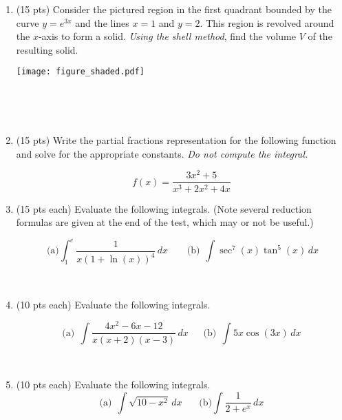 \documentclass[12pt, oneside]{article}   	%
\title{}
\author{MATH1103   \ \ \ \ \ \ Midterm 2 \ \ \ \  October 17, 2021 \ \ \ \ \  Version A \\  \\ Closed book, closed notes; show all your work.}
\date{}							%
\begin{document}
\maketitle
\begin{enumerate}

\item 
(15 pts) Consider the pictured region in the first quadrant bounded by the curve $y=e^{3x}$ and the lines $x=1$ and $y=2$.  This region is revolved around the $x$-axis to form a solid.  \emph{Using the shell method}, find the volume $V$ of the resulting solid.

\texttt{[image: figure\_shaded.pdf]}


\


\

\item (15 pts) Write the partial fractions representation for the following function and solve for the appropriate constants. \emph{Do not compute the integral.}  

$$ f(x)= \dfrac{3x^2+5}{x^3+2x^2+4x} $$


\newpage

\item (15 pts each) Evaluate the following integrals. (Note several reduction formulas are given at the end of the test, which may or not be useful.)

$$ \ \textrm{(a)} \int_1^e \dfrac{ 1}{x(1+\ln(x))^4} \, dx \ \ \ \ \ \ \ \ \ \textrm{(b)}  \ \  \int \sec^7(x) \tan^5(x) \, dx$$

\

\item (10 pts each) Evaluate the following integrals.

$$\textrm{(a)} \ \  \int   \dfrac{4x^2-6x-12}{x(x+2)(x-3)} \, dx  \ \ \ \ \ \ \  \textrm{(b)} \ \ \int 5x \cos(3x) \, dx $$


\

\item (10 pts each) Evaluate the following integrals. 
$$   \textrm{(a)} \ \  \int \sqrt{10-x^2} \, dx \ \ \ \ \ \ \ \   \textrm{(b)} \int \dfrac{1}{2+e^x} \, dx$$


\

\


\end{enumerate}
\end{document}
